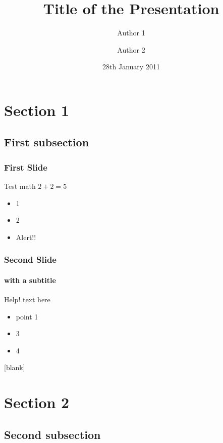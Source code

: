 \documentclass{beamer}
\title[Short Title]{Title of the Presentation}
\author[Auth. 1 \and Auth.2]{Author 1 \and Author 2}
\institute[UCL]{%
  Department of Sample Science \\ %
  University College London
}
\date{28th January 2011}
\begin{document}
\begin{frame}
  \titlepage%
\end{frame}

\section{Section 1}
\subsection{First subsection}

\begin{frame}
  \frametitle{First Slide}
  
  Test math $2+2=5$

\begin{itemize}
  \item 1
  \item 2
    \pause%
  \item \alert{Alert!!}
  \end{itemize}
\end{frame}

\begin{frame}
  \frametitle{Second Slide}
  \framesubtitle{with a subtitle}
  \begin{alertblock}{Help!}
    text here
    \begin{itemize}
    \item point 1
    \end{itemize}
  \end{alertblock}

  \begin{example}
    \begin{itemize}
    \item 3
    \item 4
    \end{itemize}
  \end{example}
\end{frame}

[blank]

\section{Section 2}
\subsection{Second subsection}
\end{document}
